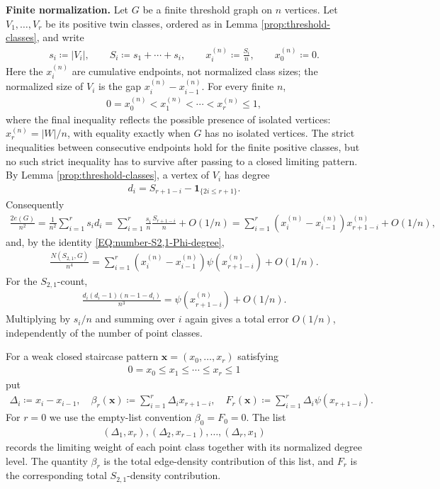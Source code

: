 \documentclass[10pt,a4paper]{article}
\newcommand{\ind}{\mathbf 1}
\begin{document}
\medskip
\noindent\textbf{Finite normalization.}
Let $G$ be a finite threshold graph on $n$ vertices.  Let $V_1,\ldots,V_r$ be its positive twin classes, ordered as in Lemma \ref{prop:threshold-classes}, and write
\begin{align*}
  s_i\coloneqq|V_i|,
  \qquad
  S_i\coloneqq s_1+\cdots+s_i,
  \qquad
  x_i^{(n)}\coloneqq\frac{S_i}{n},
  \qquad
  x_0^{(n)}\coloneqq 0.
\end{align*}
Here the $x_i^{(n)}$ are cumulative endpoints, not normalized class sizes; the normalized size of $V_i$ is the gap $x_i^{(n)}-x_{i-1}^{(n)}$.  For every finite $n$,
\begin{align*}
  0=x_0^{(n)}<x_1^{(n)}<\cdots<x_r^{(n)}\le1,
\end{align*}
where the final inequality reflects the possible presence of isolated vertices:
$x_r^{(n)}=|W|/n$, with equality exactly when $G$ has no isolated vertices.
The strict inequalities between consecutive endpoints hold for the finite
positive classes, but no such strict inequality has to survive after passing to
a closed limiting pattern.  By Lemma \ref{prop:threshold-classes}, a vertex of $V_i$ has degree
\begin{align*}
  d_i=S_{r+1-i}-\ind_{\{2i\le r+1\}}.
\end{align*}
Consequently
\begin{align}\label{eq:finite-beta}
  \frac{2e(G)}{n^2}=\frac{1}{n^2}\sum_{i=1}^{r}s_id_i=\sum_{i=1}^r\frac{s_i}{n}\frac{S_{r+1-i}}{n}+O(1/n)=\sum_{i=1}^r (x_i^{(n)}-x_{i-1}^{(n)})x_{r+1-i}^{(n)}+O(1/n),
\end{align}
and, by the identity \eqref{EQ:number-S2,1-Phi-degree},
\begin{align}\label{eq:finite-F}
  \frac{N(S_{2,1},G)}{n^4}=\sum_{i=1}^r (x_i^{(n)}-x_{i-1}^{(n)})\psi(x_{r+1-i}^{(n)})+O(1/n).
\end{align}
For the $S_{2,1}$-count, 
\begin{align*}
  \frac{d_i(d_i-1)(n-1-d_i)}{n^3}=\psi(x_{r+1-i}^{(n)})+O(1/n).
\end{align*}
Multiplying by $s_i/n$ and summing over $i$ again gives a total error $O(1/n)$, independently of the number of point classes.

For a weak closed staircase pattern $\mathbf{x}=(x_0,\ldots,x_r)$ satisfying
\begin{align*}
  0=x_0\le x_1\le\cdots\le x_r\le1
\end{align*}
put
\begin{align*}
  \Delta_i\coloneqq x_i-x_{i-1},\quad
  \beta_r(\mathbf{x})\coloneqq\sum_{i=1}^r \Delta_i x_{r+1-i},
  \quad
  F_r(\mathbf{x})\coloneqq\sum_{i=1}^r \Delta_i\psi(x_{r+1-i}).
\end{align*}
For $r=0$ we use the empty-list convention $\beta_0=F_0=0$.  The list
\begin{align*}
  (\Delta_1,x_r),(\Delta_2,x_{r-1}),\ldots,(\Delta_r,x_1)
\end{align*}
records the limiting weight of each point class together with its normalized degree level.  The quantity $\beta_r$ is the total edge-density contribution of this list, and $F_r$ is the corresponding total $S_{2,1}$-density contribution.
\end{document}
